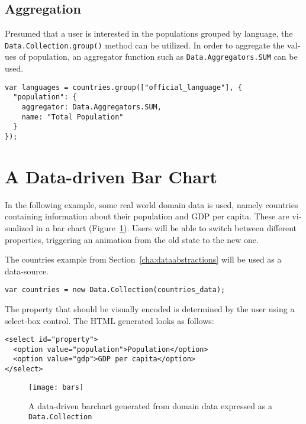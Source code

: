 \begin{english}
\subsection{Aggregation}

Presumed that a user is interested in the populations grouped by language, the \texttt{Data.Collection.group()} method can be utilized. In order to aggregate the values of population, an aggregator function such as \texttt{Data.Aggregators.SUM} can be used.

\pagebreak
\begin{verbatim}
var languages = countries.group(["official_language"], {
  "population": {
    aggregator: Data.Aggregators.SUM, 
    name: "Total Population"
  }
});
\end{verbatim}

\section{A Data-driven Bar Chart}

In the following example, some real world domain data is used, namely countries containing information about their population and GDP per capita. These are visualized in a bar chart (Figure~\ref{fig:bars}). Users will be able to switch between different properties, triggering an animation from the old state to the new one. 

\SuperPar The countries example from Section~\ref{cha:dataabstractions} will be used as a data-source.

\begin{verbatim}
var countries = new Data.Collection(countries_data);
\end{verbatim}

\SuperPar The property that should be visually encoded is determined by the user using a select-box control. The HTML generated looks as follows:

\begin{verbatim}
<select id="property">
  <option value="population">Population</option>
  <option value="gdp">GDP per capita</option>
</select>
\end{verbatim}

\begin{figure}
\centering
\texttt{[image: bars]}
\caption{A data-driven barchart generated from domain data expressed as a \texttt{Data.Collection}}
\label{fig:bars}
\end{figure}


\end{english}

